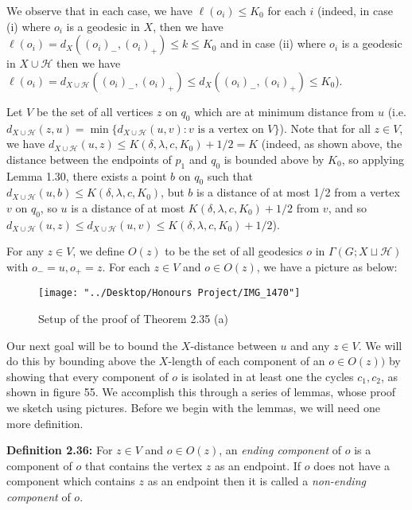 \documentclass[12pt]{article}
\newcommand{\vs}{\vskip10pt}
\begin{document}
	We observe that in each case, we have $\ell(o_i) \leq K_0$ for each $i$ (indeed, in case (i) where $o_i$ is a geodesic in $X$, then we have $\ell(o_i) = d_X((o_i)_-, (o_i)_+) \leq k \leq K_0$ and in case (ii) where $o_i$ is a geodesic in $X \cup \mathcal{H}$ then we have $\ell(o_i) = d_{X \cup \mathcal{H}}((o_i)_-, (o_i)_+) \leq d_X((o_i)_-, (o_i)_+) \leq K_0$).
	
	\vs 
	
	Let $V$ be the set of all vertices $z$ on $q_0$ which are at minimum distance from $u$ (i.e. $d_{X \cup \mathcal{H}}(z, u) = \min \{d_{X \cup \mathcal{H}}(u, v) : v \text{ is a vertex on } V\}$). Note that for all $z \in V$, we have $d_{X \cup \mathcal{H}}(u, z) \leq K(\delta, \lambda, c, K_0) + 1/2 = K$ (indeed, as shown above, the distance between the endpoints of $p_1$ and $q_0$ is bounded above by $K_0$, so applying Lemma 1.30, there exists a point $b$ on $q_0$ such that $d_{X \cup \mathcal{H}} (u, b) \leq K(\delta, \lambda, c, K_0)$, but $b$ is a distance of at most 1/2 from a vertex $v$ on $q_0$, so $u$ is a distance of at most $K(\delta, \lambda, c, K_0) + 1/2$ from $v$, and so $d_{X \cup \mathcal{H}}(u,z) \leq d_{X \cup \mathcal{H}}(u,v) \leq K(\delta, \lambda, c, K_0) + 1/2$). 
	
	\vs 
	
	For any $z \in V$, we define $O(z)$ to be the set of all geodesics $o$ in $\Gamma(G; X \sqcup \mathcal{H})$ with $o_- = u, o_+ = z$. For each $z \in V$ and $o \in O(z)$, we have a picture as below: 
	
\begin{figure} [H]
	\centering
	\texttt{[image: "../Desktop/Honours Project/IMG\_1470"]}
	\caption{Setup of the proof of Theorem 2.35 (a)}
	\label{fig:img1470}
\end{figure}
	
	Our next goal will be to bound the $X$-distance between $u$ and any $z \in V$. We will do this by bounding above the $X$-length of each component of an $o \in O(z))$ by showing that every component of $o$ is isolated in at least one the cycles $c_1, c_2$, as shown in figure 55. We accomplish this through a series of lemmas, whose proof we sketch using pictures. Before we begin with the lemmas, we will need one more definition. 
	
	\vs 
	
	\textbf{Definition 2.36: } For $z \in V$ and $o \in O(z)$, an \textit{ending component} of $o$ is a component of $o$ that contains the vertex $z$ as an endpoint. If $o$ does not have a component which contains $z$ as an endpoint then it is called a \textit{non-ending component} of $o$.
	
\end{document}
